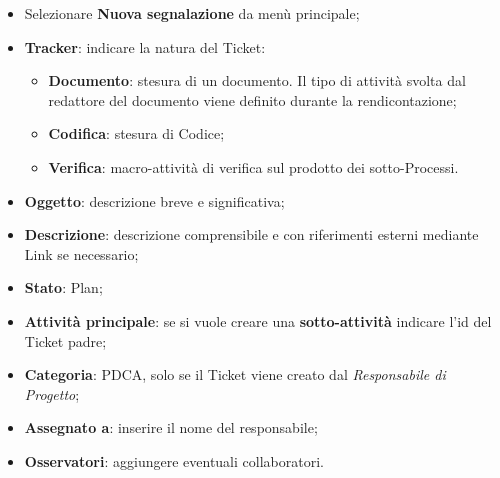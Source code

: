 
\begin{itemize}


\item Selezionare \textbf{Nuova segnalazione} da menù principale; 
\item \textbf{Tracker}: indicare la natura del Ticket: 
	\begin{itemize}
	\item \textbf{Documento}: stesura di un documento. Il tipo di attività svolta dal redattore del documento viene definito durante la rendicontazione; 
	\item \textbf{Codifica}: stesura di Codice; 
	\item \textbf{Verifica}: macro-attività di verifica sul prodotto dei sotto-Processi. 


	\end{itemize}

\item \textbf{Oggetto}: descrizione breve e significativa; 
\item \textbf{Descrizione}: descrizione comprensibile e con riferimenti esterni mediante Link se necessario; 
\item \textbf{Stato}: Plan; 
\item \textbf{Attività principale}: se si vuole creare una \textbf{sotto-attività} indicare l’id del Ticket 
padre; 
\item \textbf{Categoria}: PDCA, solo se il Ticket viene creato dal \emph{Responsabile di Progetto}; 
\item \textbf{Assegnato a}: inserire il nome del responsabile; 
\item \textbf{Osservatori}: aggiungere eventuali collaboratori.
\end{itemize}  


